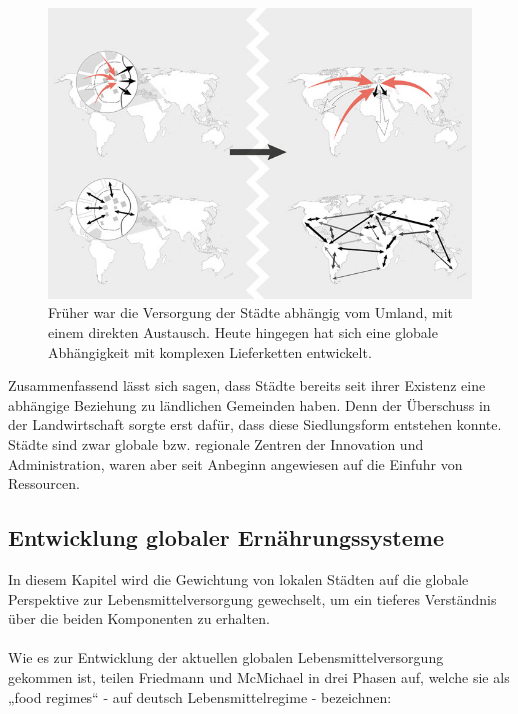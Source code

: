 \documentclass{scrartcl}
\begin{document}
\begin{figure}[h]
\centering
\includegraphics[width=12cm]{image_folder/connections_1.jpg}
\caption{Früher war die Versorgung der Städte abhängig vom Umland, mit einem direkten Austausch. Heute hingegen hat sich eine globale Abhängigkeit mit komplexen Lieferketten entwickelt.}
\label{fig:verbindungen}
\end{figure}

Zusammenfassend lässt sich sagen, dass Städte bereits seit ihrer Existenz eine abhängige Beziehung zu ländlichen Gemeinden haben. Denn der Überschuss in der Landwirtschaft sorgte erst dafür, dass diese Siedlungsform entstehen konnte. Städte sind zwar globale bzw. regionale Zentren der Innovation und Administration, waren aber seit Anbeginn angewiesen auf die Einfuhr von Ressourcen. 

\subsection{Entwicklung globaler Ernährungssysteme}
In diesem Kapitel wird die Gewichtung von lokalen Städten auf die globale Perspektive zur Lebensmittelversorgung gewechselt, um ein tieferes Verständnis über die beiden Komponenten zu erhalten.
\\
\\
Wie es zur Entwicklung der aktuellen globalen Lebensmittelversorgung gekommen ist, teilen Friedmann und McMichael in drei Phasen auf, welche sie als „food regimes“ - auf deutsch Lebensmittelregime - bezeichnen:
\end{document}
